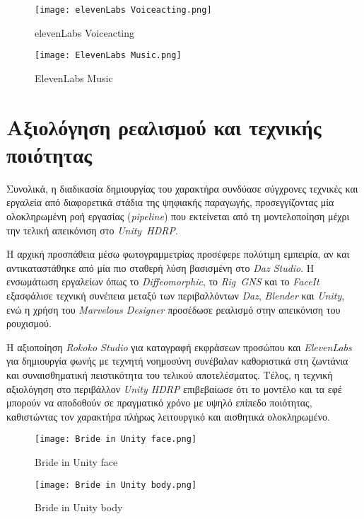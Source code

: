 \begin{figure}[H]
    \centering
    \texttt{[image: elevenLabs Voiceacting.png]}
    \caption{elevenLabs Voiceacting}
    \label{fig:placeholder}
\end{figure}
\begin{figure}[H]
    \centering
    \texttt{[image: ElevenLabs Music.png]}
    \caption{ElevenLabs Music}
    \label{fig:placeholder}
\end{figure}

\section{Αξιολόγηση ρεαλισμού και τεχνικής ποιότητας}
Συνολικά, η διαδικασία δημιουργίας του χαρακτήρα συνδύασε σύγχρονες τεχνικές 
και εργαλεία από διαφορετικά στάδια της ψηφιακής παραγωγής, 
προσεγγίζοντας μία ολοκληρωμένη ροή εργασίας (\textit{pipeline}) 
που εκτείνεται από τη μοντελοποίηση μέχρι την τελική απεικόνιση στο \textit{Unity~HDRP}. 

Η αρχική προσπάθεια μέσω φωτογραμμετρίας προσέφερε πολύτιμη εμπειρία, 
αν και αντικαταστάθηκε από μία πιο σταθερή λύση βασισμένη στο \textit{Daz Studio}. 
Η ενσωμάτωση εργαλείων όπως το \textit{Diffeomorphic}, το \textit{Rig~GNS} 
και το \textit{FaceIt} εξασφάλισε τεχνική συνέπεια μεταξύ 
των περιβαλλόντων \textit{Daz}, \textit{Blender} και \textit{Unity}, 
ενώ η χρήση του \textit{Marvelous Designer} προσέδωσε ρεαλισμό στην απεικόνιση του ρουχισμού.  

Η αξιοποίηση \textit{Rokoko Studio} για καταγραφή εκφράσεων προσώπου 
και \textit{ElevenLabs} για δημιουργία φωνής με τεχνητή νοημοσύνη 
συνέβαλαν καθοριστικά στη ζωντάνια και συναισθηματική πειστικότητα του τελικού αποτελέσματος. 
Τέλος, η τεχνική αξιολόγηση στο περιβάλλον \textit{Unity HDRP} 
επιβεβαίωσε ότι το μοντέλο και τα εφέ μπορούν να αποδοθούν σε πραγματικό χρόνο 
με υψηλό επίπεδο ποιότητας, καθιστώντας τον χαρακτήρα πλήρως λειτουργικό 
και αισθητικά ολοκληρωμένο.

\begin{figure}[H]
    \centering
    \texttt{[image: Bride in Unity face.png]}
    \caption{Bride in Unity face}
    \label{fig:placeholder}
\end{figure}

\begin{figure}[H]
    \centering
    \texttt{[image: Bride in Unity body.png]}
    \caption{Bride in Unity body}
    \label{fig:placeholder}
\end{figure}

